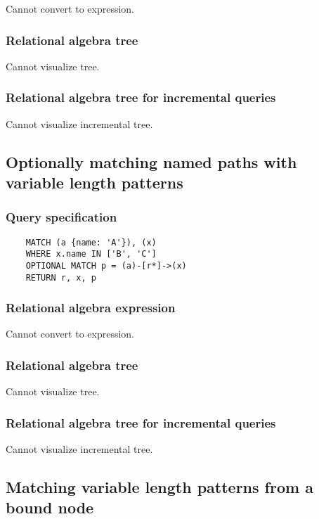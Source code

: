 	Cannot convert to expression.

	\subsubsection*{Relational algebra tree}

	Cannot visualize tree.

	\subsubsection*{Relational algebra tree for incremental queries}

	Cannot visualize incremental tree.
	\subsection{Optionally matching named paths with variable length patterns}

	\subsubsection*{Query specification}

	\begin{lstlisting}
	MATCH (a {name: 'A'}), (x)
	WHERE x.name IN ['B', 'C']
	OPTIONAL MATCH p = (a)-[r*]->(x)
	RETURN r, x, p
	\end{lstlisting}


	\subsubsection*{Relational algebra expression}

	Cannot convert to expression.

	\subsubsection*{Relational algebra tree}

	Cannot visualize tree.

	\subsubsection*{Relational algebra tree for incremental queries}

	Cannot visualize incremental tree.
	\subsection{Matching variable length patterns from a bound node}

